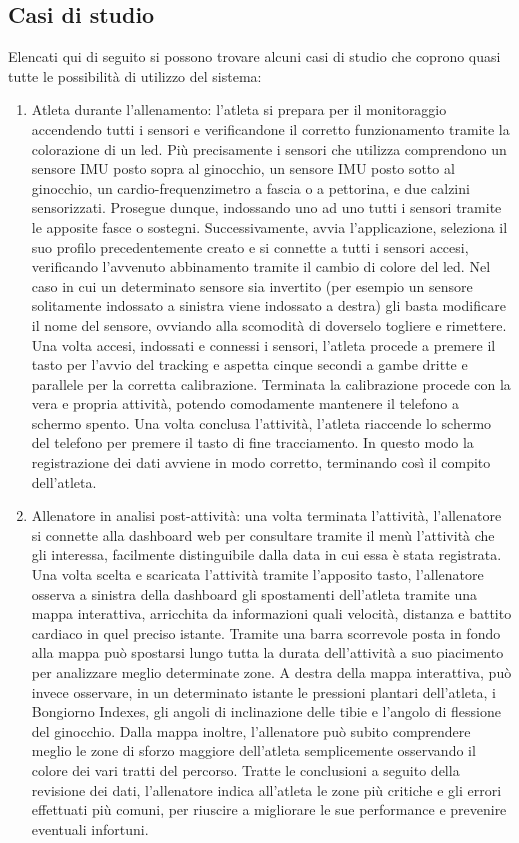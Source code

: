 \documentclass[target=bach,aauheader=,style=]{thud}
\begin{document}
\subsection{Casi di studio}
Elencati qui di seguito si possono trovare alcuni casi di studio che coprono quasi tutte le possibilità di utilizzo del sistema:
\begin{enumerate}
    \item Atleta durante l'allenamento: l'atleta si prepara per il monitoraggio accendendo tutti i sensori e verificandone il corretto funzionamento tramite la colorazione di un led. Più precisamente i sensori che utilizza comprendono un sensore IMU posto sopra al ginocchio, un sensore IMU posto sotto al ginocchio, un cardio-frequenzimetro a fascia o a pettorina, e due calzini sensorizzati. Prosegue dunque, indossando uno ad uno tutti i sensori tramite le apposite fasce o sostegni. Successivamente, avvia l'applicazione, seleziona il suo profilo precedentemente creato e si connette a tutti i sensori accesi, verificando l'avvenuto abbinamento tramite il cambio di colore del led. Nel caso in cui un determinato sensore sia invertito (per esempio un sensore solitamente indossato a sinistra viene indossato a destra) gli basta modificare il nome del sensore, ovviando alla scomodità di doverselo togliere e rimettere. Una volta accesi, indossati e connessi i sensori, l'atleta procede a premere il tasto per l'avvio del tracking e aspetta cinque secondi a gambe dritte e parallele per la corretta calibrazione. Terminata la calibrazione procede con la vera e propria attività, potendo  comodamente mantenere il telefono a schermo spento. Una volta conclusa l'attività, l'atleta riaccende lo schermo del telefono per premere il tasto di fine tracciamento. In questo modo la registrazione dei dati avviene in modo corretto, terminando così il compito dell'atleta.
    \item Allenatore in analisi post-attività: una volta terminata l'attività, l'allenatore si connette alla dashboard web per consultare tramite il menù l'attività che gli interessa, facilmente distinguibile dalla data in cui essa è stata registrata. Una volta scelta e scaricata l'attività tramite l'apposito tasto, l'allenatore osserva a sinistra della dashboard gli spostamenti dell'atleta tramite una mappa interattiva, arricchita da informazioni quali velocità, distanza e battito cardiaco in quel preciso istante. Tramite una barra scorrevole posta in fondo alla mappa può spostarsi lungo tutta la durata dell'attività a suo piacimento per analizzare meglio determinate zone. A destra della mappa interattiva, può invece osservare, in un determinato istante le pressioni plantari dell'atleta, i Bongiorno Indexes, gli angoli di inclinazione delle tibie e l'angolo di flessione del ginocchio. Dalla mappa inoltre, l'allenatore può subito comprendere meglio le zone di sforzo maggiore dell'atleta semplicemente osservando il colore dei vari tratti del percorso. Tratte le conclusioni a seguito della revisione dei dati, l'allenatore indica all'atleta le zone più critiche e gli errori effettuati più comuni, per riuscire a migliorare le sue performance e prevenire eventuali infortuni.

\end{enumerate}
\end{document}
